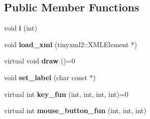 \subsection*{\-Public \-Member \-Functions}
\begin{DoxyCompactItemize}
\item 
\hypertarget{classglutpp_1_1gui_1_1object_1_1object_a006afaeceb89f8feb38bdadee1de8ab6}{void {\bfseries i} (int)}\label{classglutpp_1_1gui_1_1object_1_1object_a006afaeceb89f8feb38bdadee1de8ab6}

\item 
\hypertarget{classglutpp_1_1gui_1_1object_1_1object_a0026a69fac8b8257817395806935a348}{void {\bfseries load\-\_\-xml} (tinyxml2\-::\-X\-M\-L\-Element $\ast$)}\label{classglutpp_1_1gui_1_1object_1_1object_a0026a69fac8b8257817395806935a348}

\item 
\hypertarget{classglutpp_1_1gui_1_1object_1_1object_aa444e18e9d861c9dc3303a7baefaff25}{virtual void {\bfseries draw} ()=0}\label{classglutpp_1_1gui_1_1object_1_1object_aa444e18e9d861c9dc3303a7baefaff25}

\item 
\hypertarget{classglutpp_1_1gui_1_1object_1_1object_ac9a25796fed624c224301a7de4601937}{void {\bfseries set\-\_\-label} (char const $\ast$)}\label{classglutpp_1_1gui_1_1object_1_1object_ac9a25796fed624c224301a7de4601937}

\item 
\hypertarget{classglutpp_1_1gui_1_1object_1_1object_a63569b7bbd67ffe91fa48ce08288c388}{virtual int {\bfseries key\-\_\-fun} (int, int, int, int)=0}\label{classglutpp_1_1gui_1_1object_1_1object_a63569b7bbd67ffe91fa48ce08288c388}

\item 
\hypertarget{classglutpp_1_1gui_1_1object_1_1object_a9fe2709890ef4285fbfebec5b117eb6f}{virtual int {\bfseries mouse\-\_\-button\-\_\-fun} (int, int, int)}\label{classglutpp_1_1gui_1_1object_1_1object_a9fe2709890ef4285fbfebec5b117eb6f}

\end{DoxyCompactItemize}

